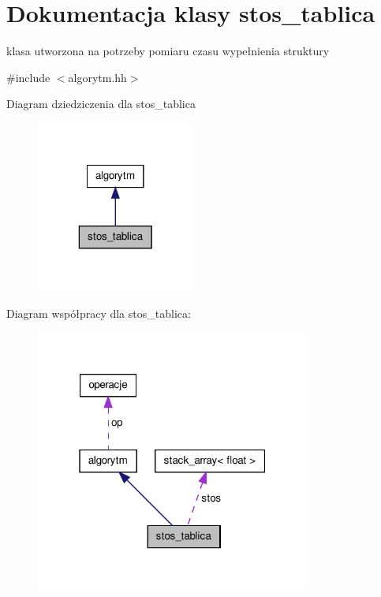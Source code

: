 \hypertarget{classstos__tablica}{\section{\-Dokumentacja klasy stos\-\_\-tablica}
\label{classstos__tablica}
}


klasa utworzona na potrzeby pomiaru czasu wypełnienia struktury  




{\ttfamily \#include $<$algorytm.\-hh$>$}



\-Diagram dziedziczenia dla stos\-\_\-tablica\nopagebreak
\begin{figure}[H]
\begin{center}
\leavevmode
\includegraphics[width=148pt]{classstos__tablica__inherit__graph}
\end{center}
\end{figure}


\-Diagram współpracy dla stos\-\_\-tablica\-:\nopagebreak
\begin{figure}[H]
\begin{center}
\leavevmode
\includegraphics[width=256pt]{classstos__tablica__coll__graph}
\end{center}
\end{figure}
